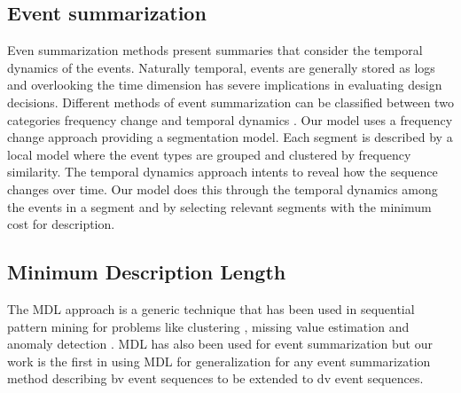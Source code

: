 \subsection{Event summarization}
Even summarization methods present summaries that consider the temporal dynamics of the events. Naturally temporal, events are generally stored as logs and overlooking the time dimension has severe implications in evaluating design decisions. Different methods of event summarization can be classified between two categories frequency change \cite{Kiernan:constructing,wang:algo} and temporal dynamics \cite{jiang:natural,Peng:2007,Schneider:2010,Tatti:2012}. Our model uses a frequency change approach providing a segmentation model. Each segment is described by a local model where the event types are grouped and clustered by frequency similarity. The temporal dynamics approach intents to reveal how the sequence changes over time. Our model does this through the temporal dynamics among the events in a segment and by selecting relevant segments with the minimum cost for description. %
\subsection{Minimum Description Length}
The MDL approach is a generic technique that has been used in sequential pattern mining for problems like clustering \cite{slim:2012}, missing value estimation \cite{Vreeken:2008} and anomaly detection \cite{Vreeken2011,Chakrabarti:1998}. MDL has also been used for event summarization \cite{Kiernan:constructing,wang:algo,jiang:natural,Tatti:2012} but our work is the first in using MDL for generalization for any event summarization method describing bv event sequences to be extended to dv event sequences.
